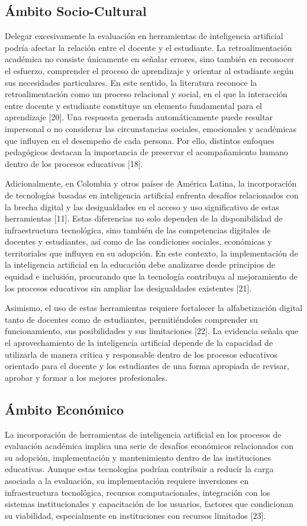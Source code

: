 \documentclass[letterpaper, 10 pt, conference]{ieeeconf}  %
\begin{document}
    \subsection{Ámbito Socio-Cultural}
    Delegar excesivamente la evaluación en herramientas de inteligencia artificial podría afectar la relación entre el docente y el estudiante. La retroalimentación académica no consiste únicamente en señalar errores, sino también en reconocer el esfuerzo, comprender el proceso de aprendizaje y orientar al estudiante según sus necesidades particulares. En este sentido, la literatura reconoce la retroalimentación como un proceso relacional y social, en el que la interacción entre docente y estudiante constituye un elemento fundamental para el aprendizaje [20]. Una respuesta generada automáticamente puede resultar impersonal o no considerar las circunstancias sociales, emocionales y académicas que influyen en el desempeño de cada persona. Por ello, distintos enfoques pedagógicos destacan la importancia de preservar el acompañamiento humano dentro de los procesos educativos [18].

    Adicionalmente, en Colombia y otros países de América Latina, la incorporación de tecnologías basadas en inteligencia artificial enfrenta desafíos relacionados con la brecha digital y las desigualdades en el acceso y uso significativo de estas herramientas [11]. Estas diferencias no solo dependen de la disponibilidad de infraestructura tecnológica, sino también de las competencias digitales de docentes y estudiantes, así como de las condiciones sociales, económicas y territoriales que influyen en su adopción. En este contexto, la implementación de la inteligencia artificial en la educación debe analizarse desde principios de equidad e inclusión, procurando que la tecnología contribuya al mejoramiento de los procesos educativos sin ampliar las desigualdades existentes [21].

    Asimismo, el uso de estas herramientas requiere fortalecer la alfabetización digital tanto de docentes como de estudiantes, permitiéndoles comprender su funcionamiento, sus posibilidades y sus limitaciones [22]. La evidencia señala que el aprovechamiento de la inteligencia artificial depende de la capacidad de utilizarla de manera crítica y responsable dentro de los procesos educativos orientado para el docente y los estudiantes de una forma apropiada de revisar, aprobar y formar a los mejores profesionales.

    \subsection{Ámbito Económico} 
    La incorporación de herramientas de inteligencia artificial en los procesos de evaluación académica implica una serie de desafíos económicos relacionados con su adopción, implementación y mantenimiento dentro de las instituciones educativas. Aunque estas tecnologías podrían contribuir a reducir la carga asociada a la evaluación, su implementación requiere inversiones en infraestructura tecnológica, recursos computacionales, integración con los sistemas institucionales y capacitación de los usuarios, factores que condicionan su viabilidad, especialmente en instituciones con recursos limitados [23].
\end{document}
